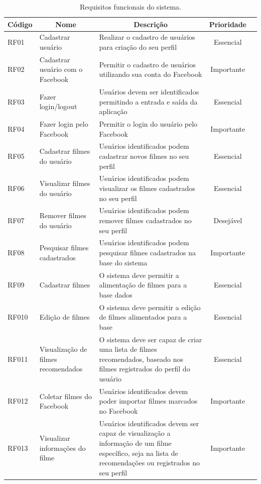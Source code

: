 \begin{table}[H]
	\label{tab:req-funcionais}
	\centering
	\caption{Requisitos funcionais do sistema.}
	\def\arraystretch{1.2} %
	\begin{tabular}{|m{1.2cm} | m{3cm} | m{7.2cm}| c | m{1.9cm}}
		\hline
		
		\multicolumn{1}{|c|}{\bfseries Código} & \multicolumn{1}{c|}{\bfseries Nome} & \multicolumn{1}{c|}{\bfseries Descrição} & \multicolumn{1}{c|}{\bfseries Prioridade} \\ \hline
		RF01	& Cadastrar usuário	& Realizar o cadastro de usuários para criação do seu perfil	& Essencial \\ \hline
		RF02	& Cadastrar usuário com o Facebook	& Permitir o cadastro de usuários utilizando sua conta do Facebook	& Importante \\ \hline
		RF03	& Fazer login/logout	& Usuários devem ser identificados permitindo a entrada e saída da aplicação	& Essencial \\ \hline
		RF04	& Fazer login pelo Facebook	& Permitir o login do usuário pelo Facebook	& Importante \\ \hline
		RF05	& Cadastrar filmes do usuário	& Usuários identificados podem cadastrar novos filmes no seu perfil	& Essencial \\ \hline
		RF06	& Visualizar filmes do usuário	& Usuários identificados podem visualizar os filmes cadastrados no seu perfil	& Essencial \\ \hline
		RF07	& Remover filmes do usuário	& Usuários identificados podem remover filmes cadastrados no seu perfil	& Desejável \\ \hline
		RF08	& Pesquisar filmes cadastrados	& Usuários identificados podem pesquisar filmes cadastrados na base do sistema	& Importante \\ \hline
		RF09	& Cadastrar filmes	& O sistema deve permitir a alimentação de filmes para a base dados	& Essencial \\ \hline
		RF010	& Edição de filmes	& O sistema deve permitir a edição de filmes alimentados para a base	& Essencial \\ \hline
		RF011	& Visualização de filmes recomendados	& O sistema deve ser capaz de criar uma lista de filmes recomendados, baseado nos filmes registrados do perfil do usuário	& Essencial \\ \hline
		RF012	& Coletar filmes do Facebook	& Usuários identificados devem poder importar filmes marcados no Facebook	& Importante \\ \hline
		RF013	& Visualizar informações do filme	& Usuários identificados devem ser capaz de visualização a informação de um filme específico, seja na lista de recomendações ou registrados no seu perfil	& Importante \\ \hline
	\end{tabular}
\end{table}

